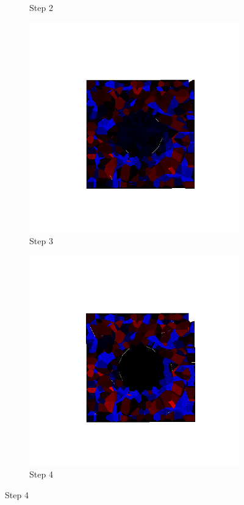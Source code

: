 \begin{figure}[ht!]
\begin{subfigure}{.25\textwidth}
      \caption{Step 2}
      \end{subfigure}%
      \begin{subfigure}{.25\textwidth}
        \centering
        \includegraphics[width=1.0\linewidth]{Files/Small_DEF/IS/DEP5-STEP(003).png}
      \caption{Step 3}
      \end{subfigure}%
      \begin{subfigure}{.25\textwidth}
        \centering
        \includegraphics[width=1.0\linewidth]{Files/Small_DEF/IS/DEP5-STEP(004).png}
      \caption{Step 4}
      \end{subfigure}


\end{figure}

